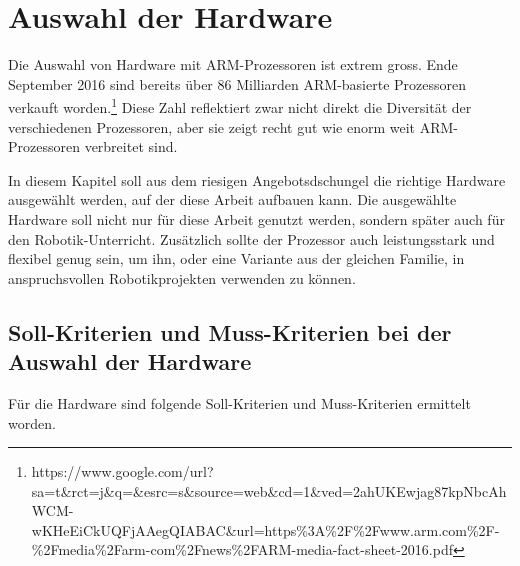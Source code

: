 \chapter{Auswahl der Hardware}
Die Auswahl von Hardware mit ARM-Prozessoren ist extrem gross.
Ende September 2016 sind bereits über 86 Milliarden ARM-basierte Prozessoren verkauft worden.\footnote{https://www.google.com/url?sa=t\&rct=j\&q=\&esrc=s\&source=web\&cd=1\&ved=2ahUKEwjag87kpNbcAhWCM-wKHeEiCkUQFjAAegQIABAC\&url=https\%3A\%2F\%2Fwww.arm.com\%2F-\%2Fmedia\%2Farm-com\%2Fnews\%2FARM-media-fact-sheet-2016.pdf}%
Diese Zahl reflektiert zwar nicht direkt die Diversität der verschiedenen Prozessoren, aber sie zeigt recht gut wie enorm weit ARM-Prozessoren verbreitet sind.

In diesem Kapitel soll aus dem riesigen Angebotsdschungel die richtige Hardware ausgewählt werden, auf der diese Arbeit aufbauen kann.
Die ausgewählte Hardware soll nicht nur für diese Arbeit genutzt werden, sondern später auch für den Robotik-Unterricht.
Zusätzlich sollte der Prozessor auch leistungsstark und flexibel genug sein, um ihn, oder eine Variante aus der gleichen Familie, in anspruchsvollen Robotikprojekten verwenden zu können.


\section{Soll-Kriterien und Muss-Kriterien bei der Auswahl der Hardware}
Für die Hardware sind folgende Soll-Kriterien und Muss-Kriterien ermittelt worden.

